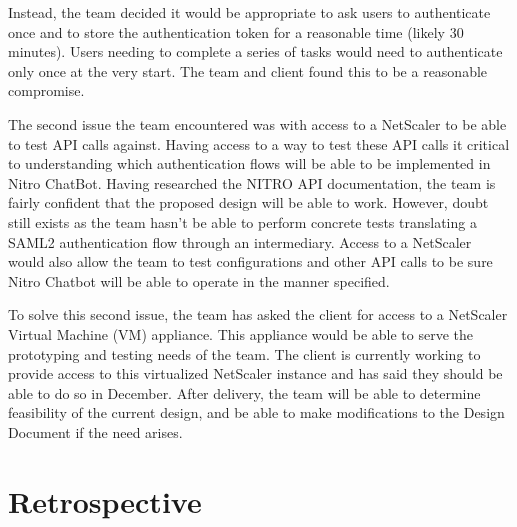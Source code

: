 \documentclass[onecolumn, draftclsnofoot,10pt, compsoc]{IEEEtran}
\begin{document}
Instead, the team decided it would be appropriate to ask users to authenticate once and to store the authentication token for a reasonable time (likely 30 minutes).
Users needing to complete a series of tasks would need to authenticate only once at the very start.
The team and client found this to be a reasonable compromise.

The second issue the team encountered was with access to a NetScaler to be able to test API calls against.
Having access to a way to test these API calls it critical to understanding which authentication flows will be able to be implemented in Nitro ChatBot.
Having researched the NITRO API documentation, the team is fairly confident that the proposed design will be able to work.
However, doubt still exists as the team hasn't be able to perform concrete tests translating a SAML2 authentication flow through an intermediary.
Access to a NetScaler would also allow the team to test configurations and other API calls to be sure Nitro Chatbot will be able to operate in the manner specified.

To solve this second issue, the team has asked the client for access to a NetScaler Virtual Machine (VM) appliance.
This appliance would be able to serve the prototyping and testing needs of the team.
The client is currently working to provide access to this virtualized NetScaler instance and has said they should be able to do so in December.
After delivery, the team will be able to determine feasibility of the current design, and be able to make modifications to the Design Document if the need arises.

\section{Retrospective}
\end{document}
